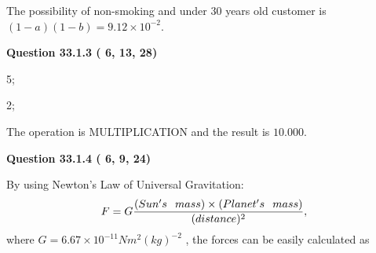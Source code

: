 \documentclass[12pt]{article}
\begin{document}
The possibility of  %
 non-smoking and  %
under 30 years old
customer is $ (1-a)(1-b) =  %
9.12 \times 10^{-2} $.
 
 
  
\vspace{0.2in}
  
{\textbf{\Large{Question
33.1.3 
 (          6,         13,         28)
}}}
  
  
 
 
\noindent{}

5;
 
2;
 
The operation is  %
MULTIPLICATION and the result is
$ %
10.000$.
 
 
 
  
\vspace{0.2in}
  
{\textbf{\Large{Question
33.1.4 
 (          6,          9,         24)
}}}
  
  
 
 
\noindent{}

By using Newton's Law of Universal Gravitation:
\[
F=G \frac{(Sun's \hspace{0.1in} mass) \times (Planet's \hspace{0.1in} mass)} { (distance)^2},
\]
where
$ G= %
6.67 \times 10^{-11} N m^{2}(kg)^{-2}$ , the forces can be easily calculated as
 
\vspace{0.2in}
 
\end{document}
